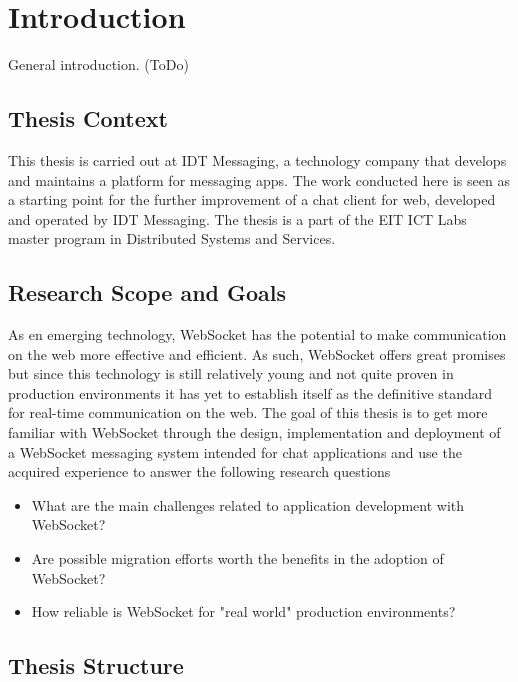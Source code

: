 \chapter{Introduction}
\label{chapter:intro}

General introduction. (ToDo)

\section{Thesis Context}

This thesis is carried out at IDT Messaging, a technology company that develops and maintains a platform for messaging apps. The work conducted here is seen as a starting point for the further improvement of a chat client for web, developed and operated by IDT Messaging. The thesis is a part of the EIT ICT Labs master program in Distributed Systems and Services.

\section{Research Scope and Goals}

As en emerging technology, WebSocket has the potential to make communication on the web more effective and efficient. As such, WebSocket offers great promises but since this technology is still relatively young and not quite proven in production environments it has yet to establish itself as the definitive standard for real-time communication on the web. The goal of this thesis is to get more familiar with WebSocket through the design, implementation and deployment of a WebSocket messaging system intended for chat applications and use the acquired experience to answer the following research questions

\begin{itemize}
\item What are the main challenges related to application development with WebSocket?
\item Are possible migration efforts worth the benefits in the adoption of WebSocket?
\item How reliable is WebSocket for "real world" production environments?
\end{itemize}

\section{Thesis Structure}

